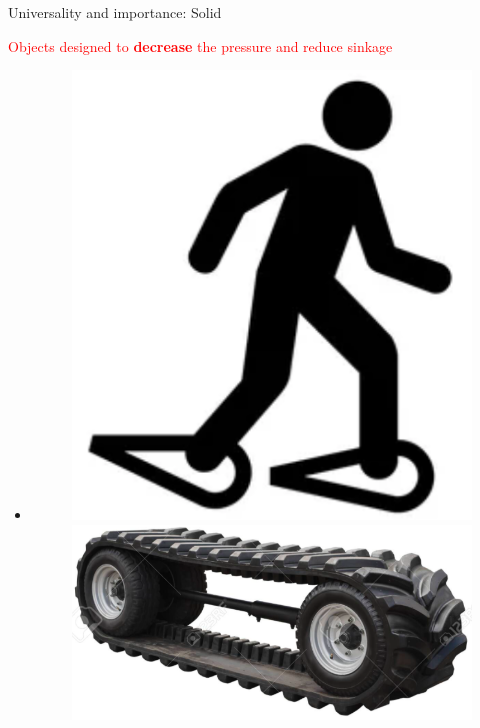 \documentclass[usenames,dvipsnames]{beamer}
\begin{document}
\begin{frame}{\huge{Universality and importance: Solid}}
\begin{itemize}
\begin{figure}
       \end{figure}
       \end{itemize}
       \textcolor{red}{Objects designed to \textbf{decrease} the pressure and reduce sinkage}
      \begin{itemize}
\item[]
       \begin{figure}
           \centering
           \includegraphics[scale=0.3]{Images/snow_racket_2.png}\hspace{0.3cm}
           \includegraphics[scale=0.27]{Images/caterpillar_wheels.png}\hspace{0.3cm}

\end{figure}
\end{itemize}
\end{frame}
\end{document}
